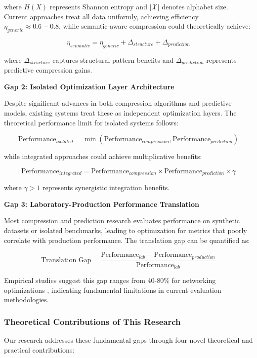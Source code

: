\documentclass[12pt,a4paper]{article}
\begin{document}
where $H(X)$ represents Shannon entropy and $|\mathcal{X}|$ denotes alphabet size. Current approaches treat all data uniformly, achieving efficiency $\eta_{generic} \approx 0.6-0.8$, while semantic-aware compression could theoretically achieve:

$$\eta_{semantic} = \eta_{generic} + \Delta_{structure} + \Delta_{prediction}$$

where $\Delta_{structure}$ captures structural pattern benefits and $\Delta_{prediction}$ represents predictive compression gains.

\textbf{Gap 2: Isolated Optimization Layer Architecture}

Despite significant advances in both compression algorithms and predictive models, existing systems treat these as independent optimization layers. The theoretical performance limit for isolated systems follows:

$$\text{Performance}_{isolated} = \min\left(\text{Performance}_{compression}, \text{Performance}_{prediction}\right)$$

while integrated approaches could achieve multiplicative benefits:

$$\text{Performance}_{integrated} = \text{Performance}_{compression} \times \text{Performance}_{prediction} \times \gamma$$

where $\gamma > 1$ represents synergistic integration benefits.

\textbf{Gap 3: Laboratory-Production Performance Translation}

Most compression and prediction research evaluates performance on synthetic datasets or isolated benchmarks, leading to optimization for metrics that poorly correlate with production performance. The translation gap can be quantified as:

$$\text{Translation Gap} = \frac{\text{Performance}_{lab} - \text{Performance}_{production}}{\text{Performance}_{lab}}$$

Empirical studies suggest this gap ranges from 40-80\% for networking optimizations \cite{clark2005design}, indicating fundamental limitations in current evaluation methodologies.

\subsubsection{Theoretical Contributions of This Research}

Our research addresses these fundamental gaps through four novel theoretical and practical contributions:
\end{document}

